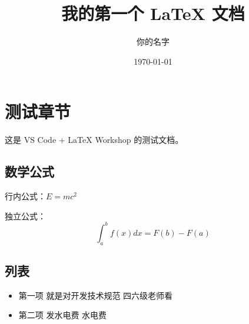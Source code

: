 \documentclass{article}
\title{我的第一个 LaTeX 文档}
\author{你的名字}
\date{\today}
\begin{document}
\maketitle

\section{测试章节}
这是 VS Code + LaTeX Workshop 的测试文档。

\subsection{数学公式}
行内公式：$E=mc^2$

独立公式：
\[
\int_{a}^{b} f(x) dx = F(b) - F(a)
\]

\subsection{列表}
\begin{itemize}
  \item 第一项 就是对开发技术规范   四六级老师看
  \item 第二项 发水电费 水电费
\end{itemize}
\end{document}
